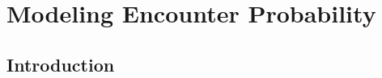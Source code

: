 \chapter{
Modeling Encounter Probability
}
\label{chapt.covariates}

\vspace{.3in}

\section{Introduction}




